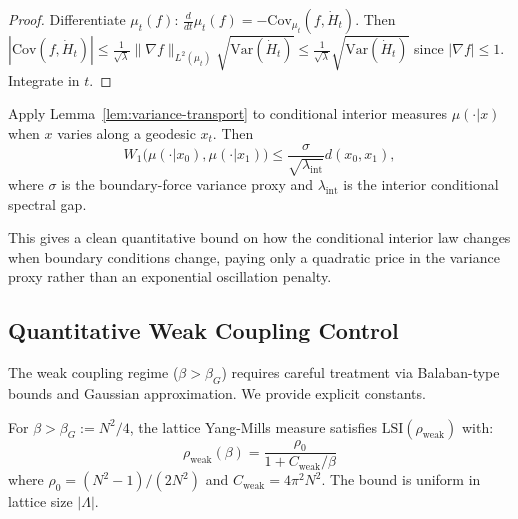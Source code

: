 \begin{proof}
Differentiate $\mu_t(f)$: $\frac{d}{dt}\mu_t(f)=-\mathrm{Cov}_{\mu_t}(f,\dot H_t)$.
Then $|\mathrm{Cov}(f,\dot H_t)| \le \frac{1}{\sqrt{\lambda}}\|\nabla f\|_{L^2(\mu_t)}\sqrt{\mathrm{Var}(\dot H_t)} \le \frac{1}{\sqrt{\lambda}}\sqrt{\mathrm{Var}(\dot H_t)}$ since $|\nabla f|\le 1$. Integrate in $t$.
\end{proof}

\begin{corollary}
Apply Lemma~\ref{lem:variance-transport} to conditional interior measures $\mu(\cdot|x)$ when $x$ varies along a geodesic $x_t$. Then
\[
W_1\bigl(\mu(\cdot|x_0),\mu(\cdot|x_1)\bigr)
\le
\frac{\sigma}{\sqrt{\lambda_{\mathrm{int}}}} d(x_0,x_1),
\]
where $\sigma$ is the boundary-force variance proxy and $\lambda_{\mathrm{int}}$ is the interior conditional spectral gap.
\end{corollary}

This gives a clean quantitative bound on how the conditional interior law changes when boundary conditions change, paying only a quadratic price in the variance proxy rather than an exponential oscillation penalty.

\subsection{Quantitative Weak Coupling Control}
\label{sec:weak-coupling-quantitative}

The weak coupling regime ($\beta > \beta_G$) requires careful treatment via 
Balaban-type bounds and Gaussian approximation. We provide explicit constants.

\begin{theorem}
\label{thm:weak-lsi-quantitative}
For $\beta > \beta_G := N^2/4$, the lattice Yang-Mills measure satisfies 
$\mathrm{LSI}(\rho_{\mathrm{weak}})$ with:
\[
\rho_{\mathrm{weak}}(\beta) = \frac{\rho_0}{1 + C_{\mathrm{weak}}/\beta}
\]
where $\rho_0 = (N^2-1)/(2N^2)$ and $C_{\mathrm{weak}} = 4\pi^2 N^2$. The bound 
is uniform in lattice size $|\Lambda|$.
\end{theorem}

